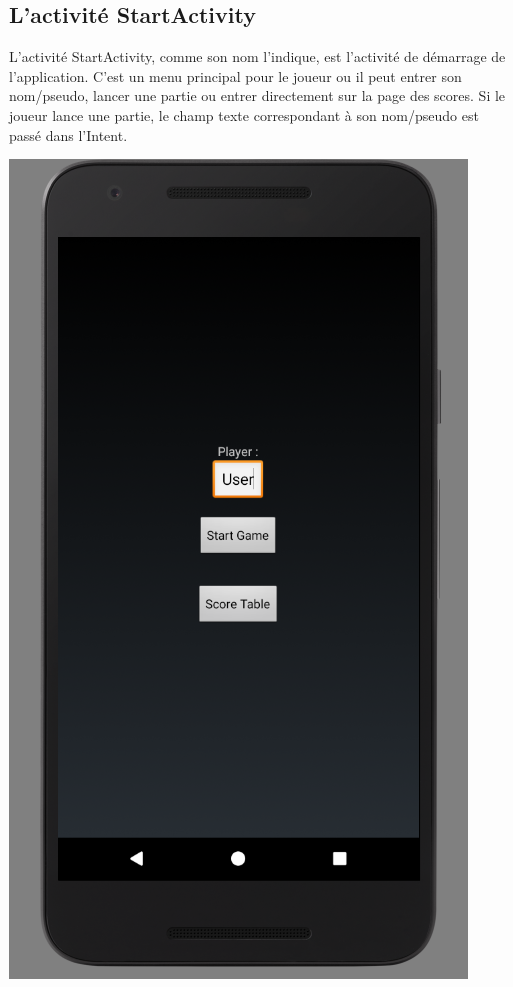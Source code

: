 \documentclass{article}
\begin{document}
\subsection{L'activité StartActivity}
L'activité StartActivity, comme son nom l'indique, est l'activité de démarrage de l'application. C'est un menu principal pour le joueur ou il peut entrer son nom/pseudo, lancer une partie ou entrer directement sur la page des scores. Si le joueur lance une partie, le champ texte correspondant à son nom/pseudo est passé dans l'Intent.
\begin{center}
  \includegraphics[scale=0.5]{StartActivity.png}
\end{center}
\end{document}
